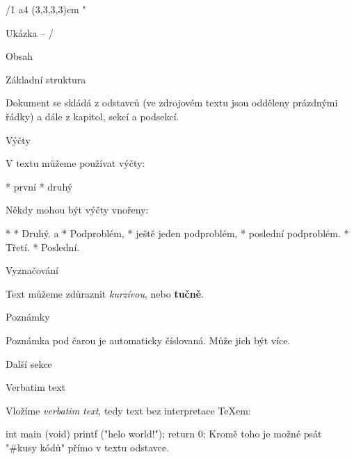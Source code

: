 
\chyph                      %
\fontfam[Schola]            %
\margins/1 a4 (3,3,3,3)cm   %
\typosize[11/13]            %
\activettchar"              %
\hyperlinks\Blue\Green      %

\def\lorem{\lipsumtext[1]}  %

\def\center{\noindent\hfil} %


\tit Ukázka -- \OpTeX/

\nonum\notoc\sec Obsah

\maketoc

\sec Základní struktura

Dokument se skládá z odstavců (ve zdrojovém textu jsou odděleny prázdnými řádky)
a dále z kapitol, sekcí a podsekcí. \lorem

\lorem

\secc Výčty

V textu můžeme používat výčty:

\begitems
* první
* druhý
\enditems

\lorem

Někdy mohou být výčty vnořeny:

\begitems
* \lorem
* Druhý.
  \begitems \style a
  * Podproblém,
  * ještě jeden podproblém,
  * poslední podproblém.
  \enditems
* Třetí.
* Poslední.
\enditems
 
\lorem

\secc Vyznačování

Text můžeme zdůraznit {\it kurzívou}, nebo {\bf tučně}. \lorem

\secc[poznamky]  Poznámky

Poznámka pod čarou je automaticky číslovaná.
Může jich být více.
\lorem\ \lorem

\sec[dalsi] Další sekce

\lorem

\secc Verbatim text

Vložíme {\it verbatim text}, tedy text  bez interpretace
\TeX{}em:

\begtt
int main (void) {
  printf ("helo world!\n");
  return 0;
}
\endtt
Kromě toho je možné psát "#kusy {kódů}" přímo v textu odstavce.

